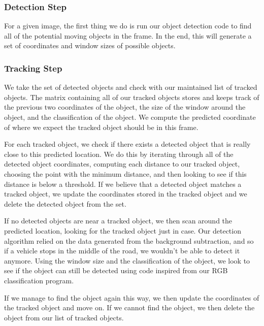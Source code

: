 \documentclass[a4paper, 10pt, conference]{ieeeconf}      %
\begin{document}
\subsubsection{Detection Step}

For a given image, the first thing we do is run our object detection code to find all of the potential moving objects in the frame. In the end, this will generate a set of coordinates and window sizes of possible objects. 
\newline


\subsubsection{Tracking Step}

We take the set of detected objects and check with our maintained list of tracked objects. The matrix containing all of our tracked objects stores and keeps track of the previous two coordinates of the object, the size of the window around the object, and the classification of the object. We compute the predicted coordinate of where we expect the tracked object should be in this frame. \newline

For each tracked object, we check if there exists a detected object that is really close to this predicted location. We do this by iterating through all of the detected object coordinates, computing each distance to our tracked object, choosing the point with the minimum distance, and then looking to see if this distance is below a threshold. If we believe that a detected object matches a tracked object, we update the coordinates stored in the tracked object and we delete the detected object from the set. \newline

If no detected objects are near a tracked object, we then scan around the predicted location, looking for the tracked object just in case. Our detection algorithm relied on the data generated from the background subtraction, and so if a vehicle stops in the middle of the road, we wouldn't be able to detect it anymore. Using the window size and the classification of the object, we look to see if the object can still be detected using code inspired from our RGB classification program. \newline

If we manage to find the object again this way, we then update the coordinates of the tracked object and move on. If we cannot find the object, we then delete the object from our list of tracked objects. \newline 
\end{document}
